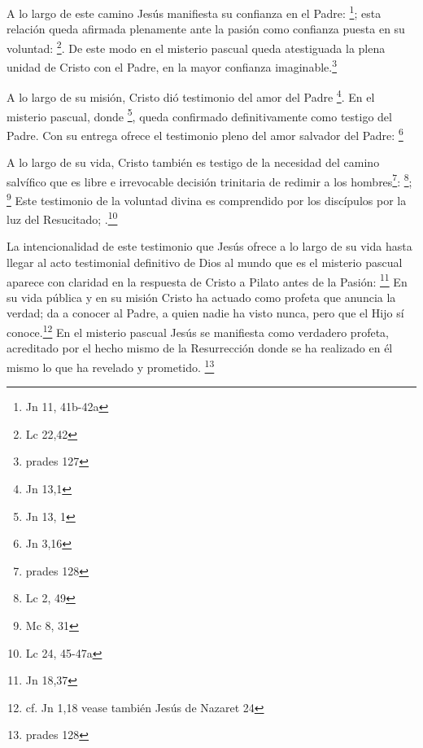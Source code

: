 A lo largo de este camino Jesús manifiesta su confianza en el Padre:
\footnote{Jn 11, 41b-42a}; esta relación queda afirmada
plenamente ante la pasión como confianza puesta en su voluntad:
\footnote{Lc 22,42}. De este modo en el misterio pascual queda
atestiguada la plena unidad de Cristo con el Padre, en la mayor confianza
imaginable.\footnote{prades 127}

A lo largo de su misión, Cristo dió testimonio del amor del Padre
\footnote{Jn 13,1}. En el misterio pascual, donde
\footnote{Jn 13, 1}, queda confirmado
definitivamente como testigo del Padre. Con su entrega ofrece el testimonio
pleno del amor salvador del Padre: \footnote{Jn 3,16}

A lo largo de su vida, Cristo también es testigo de la necesidad del camino
salvífico que es libre e irrevocable decisión trinitaria de redimir a los
hombres\footnote{prades 128}: \footnote{Lc 2, 49}; \footnote{Mc
  8, 31} Este testimonio de la voluntad divina es comprendido por los discípulos
por la luz del Resucitado; .\footnote{Lc 24, 45-47a}

La intencionalidad de este testimonio que Jesús ofrece a lo largo de su vida
hasta llegar al acto testimonial definitivo de Dios al mundo que es el misterio
pascual aparece con claridad en la respuesta de Cristo a Pilato antes de la
Pasión: \footnote{Jn 18,37} En su vida pública y en su misión Cristo ha actuado
como profeta que anuncia la verdad; da a conocer al Padre, a quien nadie ha
visto nunca, pero que el Hijo sí conoce.\footnote{cf. Jn 1,18 vease también
  Jesús de Nazaret 24} En el misterio pascual Jesús se manifiesta como verdadero
profeta, acreditado por el hecho mismo de la Resurrección donde se ha realizado
en él mismo lo que ha revelado y prometido. \footnote{prades 128}

